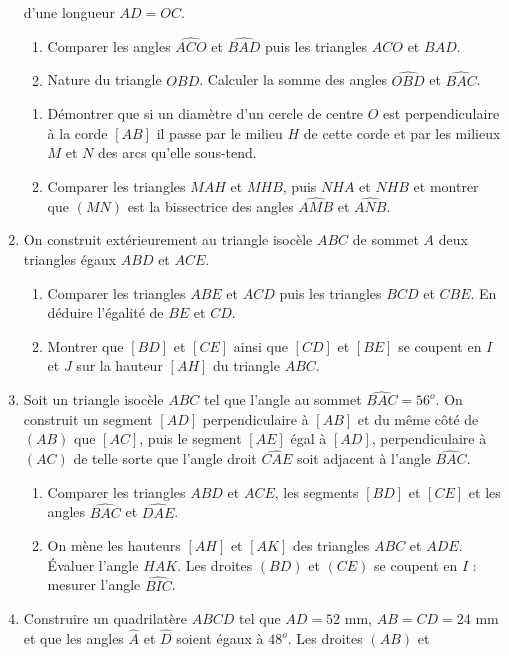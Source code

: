 \documentclass[12 pt]{report}
\theoremstyle{plain}
\newcounter{n}
\begin{document}
\begin{enumerate}
d'une longueur $AD=OC$.\begin{enumerate}
\item Comparer les angles $\widehat{ACO}$ et $\widehat{BAD}$ puis les triangles $ACO$ et $BAD$. 
\item Nature du triangle $OBD$. Calculer la somme des angles $\widehat{OBD}$ et 
$\widehat{BAC}$. 
\end{enumerate}
\begin{enumerate}
\item Démontrer que si un diamètre d'un cercle de centre $O$ est perpendiculaire
à la corde $[AB]$ il passe par le milieu $H$ de cette corde et par les milieux $M$ 
et $N$ des arcs qu'elle sous-tend.
\item Comparer les triangles $MAH$ et $MHB$, puis $NHA$ et $NHB$ et montrer que 
$(MN)$ est la bissectrice des angles $\widehat{AMB}$ et $\widehat{ANB}$. 
\end{enumerate}
\item On construit extérieurement au triangle isocèle $ABC$ de sommet $A$ deux triangles égaux $ABD$ et $ACE$. \begin{enumerate}
\item Comparer les triangles $ABE$ et $ACD$ puis les triangles $BCD$ et $CBE$. En 
déduire l'égalité de $BE$ et $CD$. 
\item Montrer que $[BD]$ et $[CE]$ ainsi que $[CD]$ et $[BE]$ se coupent en $I$ 
et $J$ sur la hauteur $[AH]$ du triangle $ABC$. 
\end{enumerate}
\item Soit un triangle isocèle $ABC$ tel que l'angle au sommet $\widehat{BAC}=56^o$.
On construit un segment $[AD]$ perpendiculaire à $[AB]$ et du même côté de $(AB)$ que $[AC]$, puis le segment $[AE]$ égal à $[AD]$, perpendiculaire à $(AC)$ de telle sorte que l'angle droit $\widehat{CAE}$ soit adjacent à l'angle $\widehat{BAC}$. 
\begin{enumerate}
\item Comparer les triangles $ABD$ et $ACE$, les segments $[BD]$ et $[CE]$ et les
angles $\widehat{BAC}$ et $\widehat{DAE}$.
\item On mène les hauteurs $[AH]$ et $[AK]$ des triangles $ABC$ et $ADE$. Évaluer 
l'angle $HAK$. Les droites $(BD)$ et $(CE)$ se coupent en $I$ : mesurer l'angle $\widehat{BIC}$.
\end{enumerate}
\item Construire un quadrilatère $ABCD$ tel que $AD=52$ mm, $AB=CD=24$ mm et que les angles $\widehat{A}$ et $\widehat{D}$ soient égaux à $48^o$. Les droites $(AB)$ et 

\end{enumerate}
\end{document}
